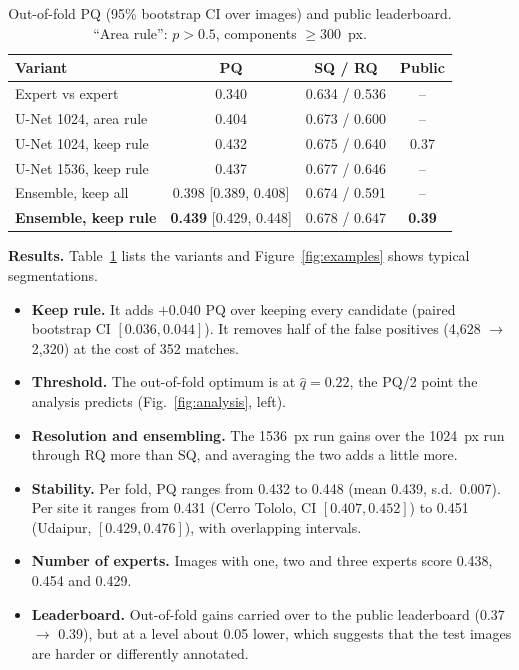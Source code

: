 \documentclass[sigconf]{acmart}
\begin{document}
\begin{table}[t]
\caption{Out-of-fold PQ (95\% bootstrap CI over images) and public leaderboard. ``Area rule'': $p>0.5$, components $\ge$300~px.}
\label{tab:ablation}
\small
\begin{tabular}{lccc}
\toprule
Variant & PQ & SQ / RQ & Public \\
\midrule
Expert vs expert & 0.340 & 0.634 / 0.536 & -- \\
U-Net 1024, area rule & 0.404 & 0.673 / 0.600 & -- \\
U-Net 1024, keep rule & 0.432 & 0.675 / 0.640 & 0.37 \\
U-Net 1536, keep rule & 0.437 & 0.677 / 0.646 & -- \\
Ensemble, keep all & 0.398 {\scriptsize [0.389, 0.408]} & 0.674 / 0.591 & -- \\
\textbf{Ensemble, keep rule} & \textbf{0.439} {\scriptsize [0.429, 0.448]} & 0.678 / 0.647 & \textbf{0.39} \\
\bottomrule
\end{tabular}
\end{table}

\textbf{Results.} Table~\ref{tab:ablation} lists the variants and Figure~\ref{fig:examples} shows typical segmentations.
\begin{itemize}
    \item \textbf{Keep rule.} It adds $+0.040$ PQ over keeping every candidate (paired bootstrap CI $[0.036, 0.044]$). It removes half of the false positives (4,628 $\rightarrow$ 2,320) at the cost of 352 matches.
    \item \textbf{Threshold.} The out-of-fold optimum is at $\hat q=0.22$, the PQ/2 point the analysis predicts (Fig.~\ref{fig:analysis}, left).
    \item \textbf{Resolution and ensembling.} The 1536~px run gains over the 1024~px run through RQ more than SQ, and averaging the two adds a little more.
    \item \textbf{Stability.} Per fold, PQ ranges from 0.432 to 0.448 (mean 0.439, s.d.\ 0.007). Per site it ranges from 0.431 (Cerro Tololo, CI $[0.407, 0.452]$) to 0.451 (Udaipur, $[0.429, 0.476]$), with overlapping intervals.
    \item \textbf{Number of experts.} Images with one, two and three experts score 0.438, 0.454 and 0.429.
    \item \textbf{Leaderboard.} Out-of-fold gains carried over to the public leaderboard (0.37 $\rightarrow$ 0.39), but at a level about 0.05 lower, which suggests that the test images are harder or differently annotated.
\end{itemize}
\end{document}
